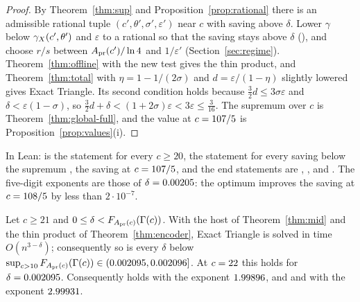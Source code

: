 \begin{proof}
By Theorem~\ref{thm:sup} and Proposition~\ref{prop:rational} there is an
admissible rational tuple \((c',\theta',\sigma',\varepsilon')\) near \(c\) with
saving above \(\delta\).  Lower \(\gamma\) below \(\gamma_{X}(c',\theta')\) and
\(\varepsilon\) to a rational so that the saving stays above \(\delta\)
(), and choose \(r/s\) between
\(A_{\mathrm{pr}}(c')/\ln4\) and \(1/\varepsilon'\) (Section~\ref{sec:regime}).
Theorem~\ref{thm:offline} with the new test gives the thin product, and
Theorem~\ref{thm:total} with \(\eta=1-1/(2\sigma)\) and
\(d=\varepsilon/(1-\eta)\) slightly lowered gives Exact Triangle.  Its second
condition holds because \(\frac32d\le3\sigma\varepsilon\) and
\(\delta<\varepsilon(1-\sigma)\), so
\(\frac32d+\delta<(1+2\sigma)\varepsilon<3\varepsilon\le\frac3{16}\).  The
supremum over \(c\) is Theorem~\ref{thm:global-full}, and the value at
\(c=107/5\) is Proposition~\ref{prop:values}(i).
\end{proof}

In Lean:  is the statement for every \(c\ge20\),
 the statement for every saving below the supremum
,  the saving at \(c=107/5\),
and the end statements are , ,
 and .  The five-digit exponents are those
of \(\delta=0.00205\): the optimum improves the saving at \(c=108/5\) by less
than \(2\cdot10^{-7}\).

\begin{theorem}\label{thm:T1}
Let \(c\ge21\) and \(0\le\delta<F_{A_{\mathrm{pr}}(c)}(\Gamma(c))\).  With the host of
Theorem~\ref{thm:mid} and the thin product of Theorem~\ref{thm:encoder}, Exact
Triangle is solved in time \(O(n^{3-\delta})\); consequently so is every
\(\delta\) below \(\sup_{c>10}F_{A_{\mathrm{pr}}(c)}(\Gamma(c))\in(0.002095,0.002096]\).  At
\(c=22\) this holds for \(\delta=0.002095\).  Consequently
 holds with the exponent \(1.99896\), and
 and  with the
exponent \(2.99931\).
\end{theorem}

